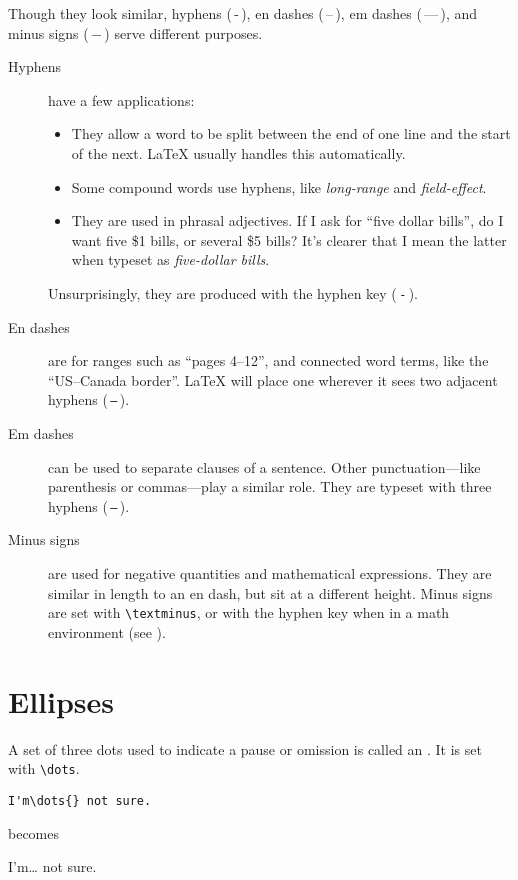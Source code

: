 Though they look similar,
hyphens (\,-\,), en dashes (\,--\,),
em dashes (\,---\,), and minus signs (\,$-$\,)
serve different purposes.
\begin{description}
\item[Hyphens] have a few applications:
    \begin{itemize}[leftmargin=*]
    \item They allow a word to be split between the end of one line and the
        start of the next.
        \LaTeX{} usually handles this automatically.
    \item Some compound words use hyphens, like \emph{long-range}
        and \emph{field-effect}.
    \item They are used in phrasal adjectives.
        If I ask for ``five dollar bills''\punckern,
        do I want five \$1 bills, or several \$5 bills?
        It's clearer that I mean the latter when typeset as
        \emph{five-dollar bills}.
    \end{itemize}
    Unsurprisingly, they are produced with the hyphen key (\,\texttt{-}\,).

\item[En dashes] are for ranges such as ``pages 4--12''\quotekern,
    and connected word terms, like the \mbox{``US--Canada} border''\quotekern.
    \LaTeX{} will place one wherever it sees two adjacent hyphens
    (\,\texttt{--}\,).

\item[Em dashes] can be used to separate clauses of a sentence.
    Other punctuation---like parenthesis or commas---play a similar
    role.
    They are typeset with three hyphens (\,\texttt{---}\,).

\item[Minus signs] are used for negative quantities and
    mathematical expressions.
    They are similar in length to an en dash,
    but sit at a different height.
    Minus signs are set with \verb|\textminus|, or with the hyphen key when in
    a math environment (see ).
\end{description}

\section{Ellipses}

A set of three dots used to indicate a pause or omission is called an
.
It is set with \verb|\dots|.
\begin{leftfigure}
\begin{lstlisting}
I'm\dots{} not sure.
\end{lstlisting}
\end{leftfigure}
becomes
\begin{leftfigure}
\lm%
I'm\dots{} not sure.
\end{leftfigure}

